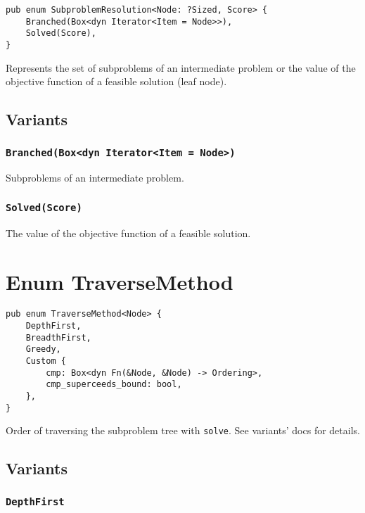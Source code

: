 \hypertarget{apx:SubproblemResolution}{}

\begin{lstlisting}
pub enum SubproblemResolution<Node: ?Sized, Score> {
    Branched(Box<dyn Iterator<Item = Node>>),
    Solved(Score),
}
\end{lstlisting}

Represents the set of subproblems of an intermediate problem or the value of the objective function of a feasible solution (leaf node).

\subsection*{Variants}

\subsubsection*{\texttt{Branched(Box<dyn Iterator<Item = Node>)}}

Subproblems of an intermediate problem.

\subsubsection*{\texttt{Solved(Score)}}

The value of the objective function of a feasible solution.

\section*{Enum TraverseMethod}

\hypertarget{apx:TraverseMethod}{}

\begin{lstlisting}
pub enum TraverseMethod<Node> {
    DepthFirst,
    BreadthFirst,
    Greedy,
    Custom {
        cmp: Box<dyn Fn(&Node, &Node) -> Ordering>,
        cmp_superceeds_bound: bool,
    },
}
\end{lstlisting}

Order of traversing the subproblem tree with \texttt{solve}. See variants’ docs for details.

\subsection*{Variants}

\subsubsection*{\texttt{DepthFirst}}


